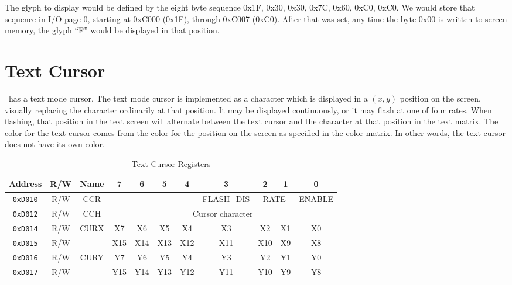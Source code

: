 The glyph to display would be defined by the eight byte sequence 0x1F, 0x30, 0x30, 0x7C, 0x60, 0xC0, 0xC0. We would store that sequence in I/O page 0, starting at 0xC000 (0x1F), through 0xC007 (0xC0). After that was set, any time the byte 0x00 is written to screen memory, the glyph ``F'' would be displayed in that position.

\section*{Text Cursor}

\jr\ has a text mode cursor. The text mode cursor is implemented as a character which is displayed in a $(x, y)$ position on the screen, visually replacing the character ordinarily at that position. It may be displayed continuously, or it may flash at one of four rates. When flashing, that position in the text screen will alternate between the text cursor and the character at that position in the text matrix. The color for the text cursor comes from the color for the position on the screen as specified in the color matrix. In other words, the text cursor does not have its own color.

\begin{table}[ht]
    \begin{center}
        \begin{tabular}{|c|c|c|c|c|c|c|c|c|c|c|} \hline
            Address & R/W & Name & 7 & 6 & 5 & 4 & 3 & 2 & 1 & 0 \\\hline\hline
            \verb+0xD010+ & R/W & CCR & \multicolumn{4}{|c|}{---} & FLASH\_DIS & \multicolumn{2}{|c|}{RATE} & ENABLE \\ \hline
            \verb+0xD012+ & R/W & CCH & \multicolumn{8}{|c|}{Cursor character} \\ \hline
            \verb+0xD014+ & R/W & \multirow{2}{*}{CURX} & X7 & X6 & X5 & X4 & X3 & X2 & X1 & X0 \\ \cline{1-2}\cline{4-11}
            \verb+0xD015+ & R/W &  & X15 & X14 & X13 & X12 & X11 & X10 & X9 & X8 \\ \hline
            \verb+0xD016+ & R/W & \multirow{2}{*}{CURY} & Y7 & Y6 & Y5 & Y4 & Y3 & Y2 & Y1 & Y0 \\ \cline{1-2}\cline{4-11}
            \verb+0xD017+ & R/W &  & Y15 & Y14 & Y13 & Y12 & Y11 & Y10 & Y9 & Y8 \\ \hline
        \end{tabular}
    \end{center}
    \caption{Text Cursor Registers}
    \label{tab:txt_crsr_reg}
\end{table}

